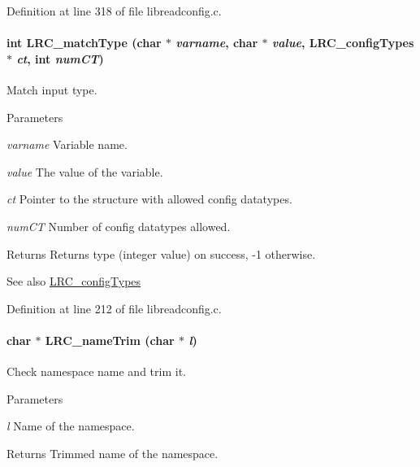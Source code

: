 Definition at line 318 of file libreadconfig.c.\hypertarget{group___l_r_c__internals_ga4b2785b5ee9a3ab984c9dcfd3f9b3283}{
\paragraph[{LRC\_\-matchType}]{\setlength{\rightskip}{0pt plus 5cm}int LRC\_\-matchType (char $\ast$ {\em varname}, \/  char $\ast$ {\em value}, \/  {\bf LRC\_\-configTypes} $\ast$ {\em ct}, \/  int {\em numCT})}\hfill}
\label{group___l_r_c__internals_ga4b2785b5ee9a3ab984c9dcfd3f9b3283}


Match input type. 
\begin{DoxyParams}{Parameters}
\item[{\em varname}]Variable name.\item[{\em value}]The value of the variable.\item[{\em ct}]Pointer to the structure with allowed config datatypes.\item[{\em numCT}]Number of config datatypes allowed.\end{DoxyParams}
\begin{DoxyReturn}{Returns}
Returns type (integer value) on success, -\/1 otherwise. 
\end{DoxyReturn}
\begin{DoxySeeAlso}{See also}
\hyperlink{struct_l_r_c__config_types}{LRC\_\-configTypes} 
\end{DoxySeeAlso}


Definition at line 212 of file libreadconfig.c.\hypertarget{group___l_r_c__internals_ga713edeb31c0d15e409403be5a5f28ad8}{
\paragraph[{LRC\_\-nameTrim}]{\setlength{\rightskip}{0pt plus 5cm}char $\ast$ LRC\_\-nameTrim (char $\ast$ {\em l})}\hfill}
\label{group___l_r_c__internals_ga713edeb31c0d15e409403be5a5f28ad8}


Check namespace name and trim it. 
\begin{DoxyParams}{Parameters}
\item[{\em l}]Name of the namespace.\end{DoxyParams}
\begin{DoxyReturn}{Returns}
Trimmed name of the namespace. 
\end{DoxyReturn}


